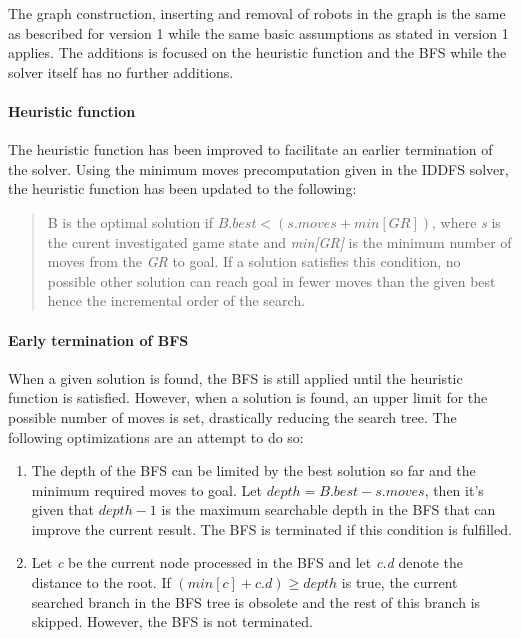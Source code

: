 \documentclass[]{article}
\providecommand{\tightlist}{%
  \setlength{\itemsep}{0pt}\setlength{\parskip}{0pt}}
\let\oldparagraph\paragraph
\renewcommand{\paragraph}[1]{\oldparagraph{#1}\mbox{}}
\begin{document}
The graph construction, inserting and removal of robots in the graph is
the same as bescribed for version 1 while the same basic assumptions as
stated in version 1 applies. The additions is focused on the heuristic
function and the BFS while the solver itself has no further additions.

\paragraph{Heuristic function}\label{heuristic-function}

The heuristic function has been improved to facilitate an earlier
termination of the solver. Using the minimum moves precomputation given
in the IDDFS solver, the heuristic function has been updated to the
following:

\begin{quote}
B is the optimal solution if \(B.best < (s.moves + min[GR])\), where
\emph{s} is the curent investigated game state and \emph{min{[}GR{]}} is
the minimum number of moves from the \emph{GR} to goal. If a solution
satisfies this condition, no possible other solution can reach goal in
fewer moves than the given best hence the incremental order of the
search.
\end{quote}

\paragraph{Early termination of BFS}\label{early-termination-of-bfs}

When a given solution is found, the BFS is still applied until the
heuristic function is satisfied. However, when a solution is found, an
upper limit for the possible number of moves is set, drastically
reducing the search tree. The following optimizations are an attempt to
do so:

\begin{enumerate}
\def\labelenumi{\arabic{enumi}.}
\tightlist
\item
  The depth of the BFS can be limited by the best solution so far and
  the minimum required moves to goal. Let \(depth = B.best - s.moves\),
  then it's given that \(depth - 1\) is the maximum searchable depth in
  the BFS that can improve the current result. The BFS is terminated if
  this condition is fulfilled.
\item
  Let \emph{c} be the current node processed in the BFS and let
  \emph{c.d} denote the distance to the root. If
  \((min[c] + c.d) \geq depth\) is true, the current searched branch in
  the BFS tree is obsolete and the rest of this branch is skipped.
  However, the BFS is not terminated.
\end{enumerate}
\end{document}
